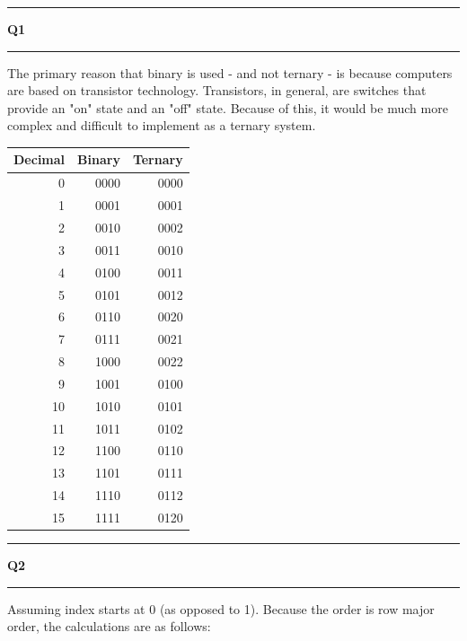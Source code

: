 \documentclass[11pt]{article}
\newcommand\question[2]{\vspace{.25in}\hrule\textbf{#1 #2}\vspace{.5em}\hrule\vspace{.10in}}
\begin{document}
\raggedright
\newcommand\NAME{Sean Connor}  %
\newcommand\HWNUM{1}              %


\question{Q1}{} 

The primary reason that binary is used - and not ternary - is because computers are based on transistor technology. Transistors, in general, are switches that provide an "on" state and an "off" state. Because of this, it would be much more complex and difficult to implement as a ternary system.

\begin{table}[h!]
	\begin{center}
		\begin{tabular}{r|r|r} %
			\textbf{Decimal} & \textbf{Binary} & \textbf{Ternary}\\
			\hline
			0 & 0000 & 0000\\
			1 & 0001 & 0001\\
			2 & 0010 & 0002\\
			3 & 0011 & 0010\\
			4 & 0100 & 0011\\
			5 & 0101 & 0012\\
			6 & 0110 & 0020\\
			7 & 0111 & 0021\\
			8 & 1000 & 0022\\
			9 & 1001 & 0100\\
			10 & 1010 & 0101\\
			11 & 1011 & 0102\\
			12 & 1100 & 0110\\
			13 & 1101 & 0111\\
			14 & 1110 & 0112\\
			15 & 1111 & 0120\\
		\end{tabular}
	\end{center}
\end{table}


\question{Q2}{}
Assuming index starts at 0 (as opposed to 1). Because the order is row major order, the calculations are as follows:
\end{document}
